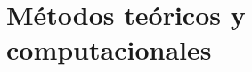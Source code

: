 \documentclass[12pt,spanish]{book}
\begin{document}





% 
\chapter[Métodos teóricos y computacionales]{Métodos teóricos y computacionales}


% 


\end{document}
